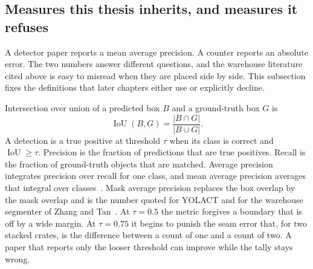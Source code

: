 \subsection{Measures this thesis inherits, and measures it refuses}
\label{sec:metrics}

A detector paper reports a mean average precision. A counter reports an absolute error. The two numbers answer different questions, and the warehouse literature cited above is easy to misread when they are placed side by side. This subsection fixes the definitions that later chapters either use or explicitly decline.

Intersection over union of a predicted box $B$ and a ground-truth box $G$ is
\begin{equation}
\operatorname{IoU}(B,G)
= \frac{\lvert B\cap G\rvert}{\lvert B\cup G\rvert}.
\label{eq:iou}
\end{equation}
A detection is a true positive at threshold $\tau$ when its class is correct and $\operatorname{IoU}\ge\tau$. Precision is the fraction of predictions that are true positives. Recall is the fraction of ground-truth objects that are matched. Average precision integrates precision over recall for one class, and mean average precision averages that integral over classes~\cite{lin2014coco,everingham2010pascal}. Mask average precision replaces the box overlap by the mask overlap and is the number quoted for YOLACT and for the warehouse segmenter of Zhang and Tan~\cite{bolya2019yolact,zhang2025warehouse}. At $\tau=0.5$ the metric forgives a boundary that is off by a wide margin. At $\tau=0.75$ it begins to punish the seam error that, for two stacked crates, is the difference between a count of one and a count of two. A paper that reports only the looser threshold can improve while the tally stays wrong.

